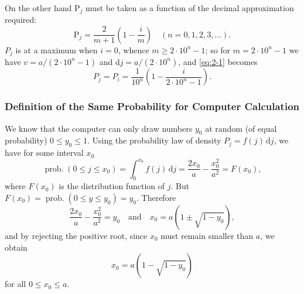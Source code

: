 \documentclass[letterpaper, 11pt]{article}
\begin{document}
On the other hand \( \mathrm{P}_j \) must be taken as a function of the decimal approximation required:
\[ \mathrm{P}_j = \frac{2}{m + 1} \left( 1 - \frac{i}{m} \right) \quad (n = 0, 1, 2, 3, \dots) . \]
\( P_j \) is at a maximum when \( i = 0 \), whence \( m \geq 2 \cdot 10^n - 1 \); so for \( m = 2 \cdot 10^n - 1 \) we have \( v = a / (2 \cdot 10^n - 1 ) \) and \( \mathrm{d}j = a / (2 \cdot 10^n) \), and \eqref{eq:2-1} becomes
\[ P_j = P_i = \frac{1}{10^n} \left( 1 - \frac{i}{2 \cdot 10^n - 1} \right). \]


\subsubsection*{Definition of the Same Probability for Computer Calculation}

We know that the computer can only draw numbers \( y_0 \) at random (of equal probability) \( 0 \leq y_0 \leq 1 \).
Using the probability law of density \( P_j = f(j) \, \mathrm{d}j \), we have for some interval \( x_0 \)
\[ \operatorname{prob.}{(0 \leq j \leq x_0)} = \int_0^{x_0} f(j) \, \mathrm{d}j = \frac{2x_0}{a} - \frac{x_0^2}{a^2} = F(x_0), \]
where \( F(x_0) \) is the distribution function of \( j \).
But \( F(x_0) = \operatorname{prob.}{(0 \leq y \leq y_0)} = y_0 \).
Therefore
\[ \frac{2x_0}{a} - \frac{x_0^2}{a^2} = y_0 \quad \text{and} \quad x_0 = a \left( 1 \pm \sqrt{1 - y_0} \right), \]
and by rejecting the positive root, since \( x_0 \) must remain smaller than \( a \), we
obtain
\[ x_0 = a \left( 1 - \sqrt{1 - y_0} \right) \]
for all \( 0 \leq x_0 \leq a \).
\end{document}
